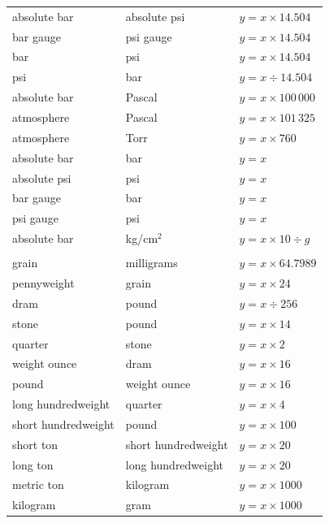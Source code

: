\documentclass[11pt,a4paper]{report}
\begin{document}
{\begin{longtable}{l l l}
absolute bar      & absolute psi      & $y = x \times 14.504$ \\
bar gauge         & psi gauge         & $y = x \times 14.504$ \\
bar               & psi               & $y = x \times 14.504$ \\
psi               & bar               & $y = x \div 14.504$ \\
absolute bar      & Pascal            & $y = x \times 100\,000$ \\
atmosphere        & Pascal            & $y = x \times 101\,325$ \\
atmosphere        & Torr              & $y = x \times 760$ \\
absolute bar      & bar               & $y = x$ \\
absolute psi      & psi               & $y = x$ \\
bar gauge         & bar               & $y = x$ \\
psi gauge         & psi               & $y = x$ \\
absolute bar      & kg/cm$^2$         & $y = x \times 10 \div g$ \\
\addlinespace
\multicolumn{3}{l}{\textbf{Mass}} \\
\midrule
grain             & milligrams        & $y = x \times 64.7989$ \\
pennyweight       & grain             & $y = x \times 24$ \\
dram              & pound             & $y = x \div 256$ \\
stone             & pound             & $y = x \times 14$ \\
quarter           & stone             & $y = x \times 2$ \\
weight ounce      & dram              & $y = x \times 16$ \\
pound             & weight ounce      & $y = x \times 16$ \\
long hundredweight & quarter          & $y = x \times 4$ \\
short hundredweight & pound           & $y = x \times 100$ \\
short ton         & short hundredweight & $y = x \times 20$ \\
long ton          & long hundredweight & $y = x \times 20$ \\
metric ton        & kilogram          & $y = x \times 1000$ \\
kilogram          & gram              & $y = x \times 1000$ \\

\end{longtable}}
\end{document}
